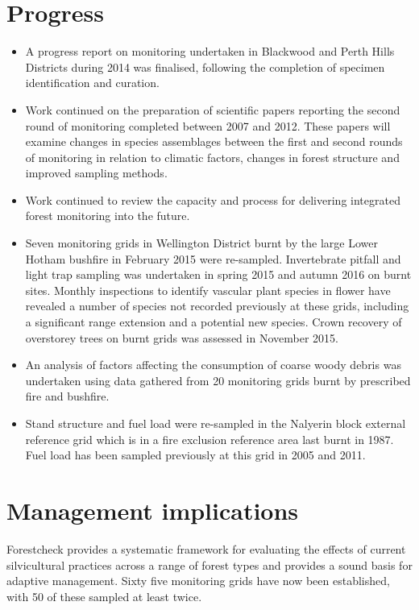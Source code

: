 \documentclass[version=last,
    paper=a4, %
    10pt, %
    usenames,
    dvipsnames,
    oneside, %
    headings=openany, %
    DIV=15 %
]{scrbook}
\begin{document}
\section*{Progress}
\begin{itemize}
\itemsep1pt\parskip0pt
\item
  A progress report on monitoring undertaken in Blackwood and Perth
  Hills Districts during 2014 was finalised, following the completion of
  specimen identification and curation.
\item
  Work continued on the preparation of scientific papers reporting the
  second round of monitoring completed between 2007 and 2012. These
  papers will examine changes in species assemblages between the first
  and second rounds of monitoring in relation to climatic factors,
  changes in forest structure and improved sampling methods.
\item
  Work continued to review the capacity and process for delivering
  integrated forest monitoring into the future.
\item
  Seven monitoring grids in Wellington District burnt by the large Lower
  Hotham bushfire in February 2015 were re-sampled. Invertebrate pitfall
  and light trap sampling was undertaken in spring 2015 and autumn 2016
  on burnt sites. Monthly inspections to identify vascular plant species
  in flower have revealed a number of species not recorded previously at
  these grids, including a significant range extension and a potential
  new species. Crown recovery of overstorey trees on burnt grids was
  assessed in November 2015.
\item
  An analysis of factors affecting the consumption of coarse woody
  debris was undertaken using data gathered from 20 monitoring grids
  burnt by prescribed fire and bushfire.
\item
  Stand structure and fuel load were re-sampled in the Nalyerin block
  external reference grid which is in a fire exclusion reference area
  last burnt in 1987. Fuel load has been sampled previously at this grid
  in 2005 and 2011.
\end{itemize}



\section*{Management implications}
Forestcheck provides a systematic framework for evaluating the effects
of current silvicultural practices across a range of forest types and
provides a sound basis for adaptive management. Sixty five monitoring
grids have now been established, with 50 of these sampled at least
twice.
\end{document}
